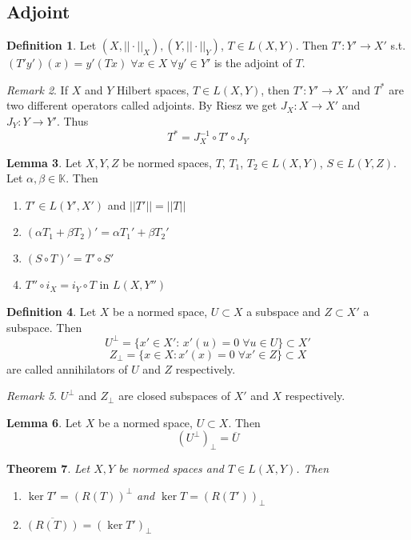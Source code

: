 \documentclass[a4paper, 12pt]{article}
\theoremstyle{plain}
\newtheorem{theorem}{Theorem}[subsection] %
\theoremstyle{definition}
\newtheorem{definition}[theorem]{Definition} %
\theoremstyle{lemma}
\newtheorem{lemma}[theorem]{Lemma}
\theoremstyle{remark}
\newtheorem{remark}[theorem]{Remark}
\theoremstyle{corollary}
\theoremstyle{example}
\begin{document}
	\subsection{Adjoint}
	\begin{definition}
		Let $(X,||\cdot||_X), (Y,||\cdot||_Y)$, $T\in L(X,Y)$. Then $T':Y'\to X'$ s.t. $(T'y')(x) = y'(Tx) \;\forall x \in X\; \forall y'\in Y'$ is the adjoint of $T$.
	\end{definition}
	\begin{remark}
		If $X$ and $Y$ Hilbert spaces, $T\in L(X,Y)$, then $T':Y'\to X'$ and $T^*$ are two different operators called adjoints. By Riesz we get $J_X:X\to X'$ and $J_Y:Y\to Y'$. Thus \[T^* = J_X^{-1}\circ T' \circ J_Y\]
	\end{remark}
	\begin{lemma}
		Let $X,Y,Z$ be normed spaces, $T$, $T_1$, $T_2 \in L(X,Y)$, $S \in L(Y,Z)$. Let $\alpha, \beta \in \mathbb{K}$. Then \begin{enumerate}
			\item $T' \in L(Y',X')$ and $||T'|| = ||T||$
			\item $(\alpha T_1 + \beta T_2)' = \alpha T_1' + \beta T_2'$
			\item $(S\circ T)' = T' \circ S'$
			\item $T''\circ i_X = i_Y \circ T$ in $L(X,Y'')$
		\end{enumerate}
	\end{lemma}
	\begin{definition}
		Let $X$ be a normed space, $U\subset X$ a subspace and $Z\subset X'$ a subspace. Then \[U^\bot = \{x' \in X': \, x'(u) = 0 \; \forall u \in U\} \subset X'\]
		\[Z_\bot = \{x \in X: x'(x) = 0 \; \forall x' \in Z\} \subset X\] are called annihilators of $U$ and $Z$ respectively.
	\end{definition}
	\begin{remark}
		$U^\bot$ and $Z_\bot$ are closed subspaces of $X'$ and $X$ respectively.
	\end{remark}
	\begin{lemma}
		Let $X$ be a normed space, $U\subset X$. Then \[(U^\bot)_\bot = \overline{U}\]
	\end{lemma}
	\begin{theorem}
		Let $X,Y$ be normed spaces and $T\in L(X,Y)$. Then \begin{enumerate}
			\item $\ker T' = (R(T))^\bot$ and $\ker T = (R(T'))_\bot$
			\item $\overline{(R(T))} = (\ker T')_\bot$
		\end{enumerate}
	\end{theorem}
\end{document}
